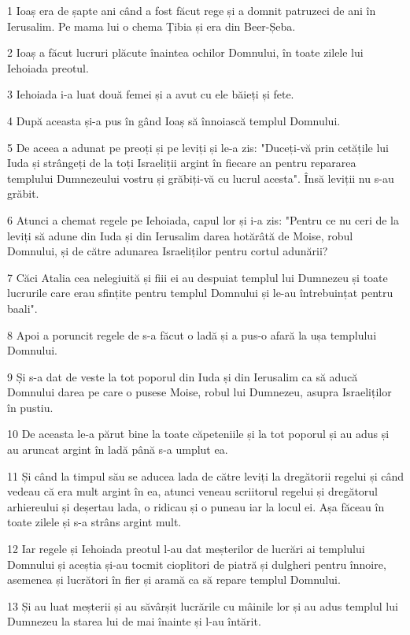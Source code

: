 \par 1 Ioaș era de șapte ani când a fost făcut rege și a domnit patruzeci de ani în Ierusalim. Pe mama lui o chema Țibia și era din Beer-Șeba.
\par 2 Ioaș a făcut lucruri plăcute înaintea ochilor Domnului, în toate zilele lui Iehoiada preotul.
\par 3 Iehoiada i-a luat două femei și a avut cu ele băieți și fete.
\par 4 După aceasta și-a pus în gând Ioaș să înnoiască templul Domnului.
\par 5 De aceea a adunat pe preoți și pe leviți și le-a zis: "Duceți-vă prin cetățile lui Iuda și strângeți de la toți Israeliții argint în fiecare an pentru repararea templului Dumnezeului vostru și grăbiți-vă cu lucrul acesta". Însă leviții nu s-au grăbit.
\par 6 Atunci a chemat regele pe Iehoiada, capul lor și i-a zis: "Pentru ce nu ceri de la leviți să adune din Iuda și din Ierusalim darea hotărâtă de Moise, robul Domnului, și de către adunarea Israeliților pentru cortul adunării?
\par 7 Căci Atalia cea nelegiuită și fiii ei au despuiat templul lui Dumnezeu și toate lucrurile care erau sfințite pentru templul Domnului și le-au întrebuințat pentru baali".
\par 8 Apoi a poruncit regele de s-a făcut o ladă și a pus-o afară la ușa templului Domnului.
\par 9 Și s-a dat de veste la tot poporul din Iuda și din Ierusalim ca să aducă Domnului darea pe care o pusese Moise, robul lui Dumnezeu, asupra Israeliților în pustiu.
\par 10 De aceasta le-a părut bine la toate căpeteniile și la tot poporul și au adus și au aruncat argint în ladă până s-a umplut ea.
\par 11 Și când la timpul său se aducea lada de către leviți la dregătorii regelui și când vedeau că era mult argint în ea, atunci veneau scriitorul regelui și dregătorul arhiereului și deșertau lada, o ridicau și o puneau iar la locul ei. Așa făceau în toate zilele și s-a strâns argint mult.
\par 12 Iar regele și Iehoiada preotul l-au dat meșterilor de lucrări ai templului Domnului și aceștia și-au tocmit cioplitori de piatră și dulgheri pentru înnoire, asemenea și lucrători în fier și aramă ca să repare templul Domnului.
\par 13 Și au luat meșterii și au săvârșit lucrările cu mâinile lor și au adus templul lui Dumnezeu la starea lui de mai înainte și l-au întărit.
